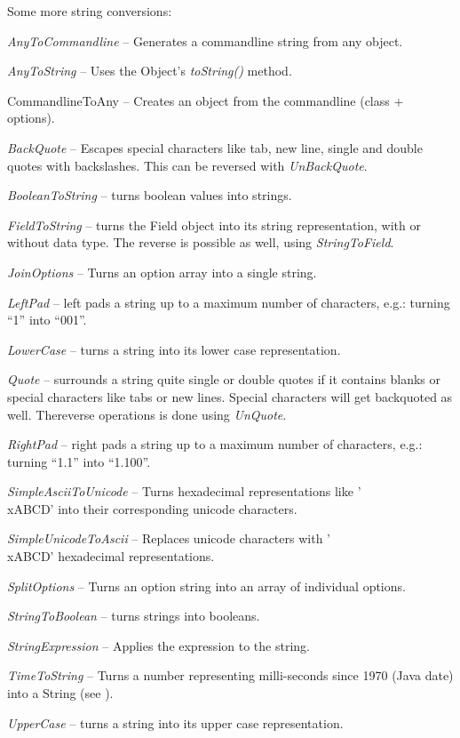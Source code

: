 Some more string conversions:
\begin{tight_itemize}
	\item \textit{AnyToCommandline} -- Generates a commandline string from any
	object.
	\item \textit{AnyToString} -- Uses the Object's \textit{toString()} method.
	\item CommandlineToAny -- Creates an object from the commandline (class +
	options).
	\item \textit{BackQuote} -- Escapes special characters like tab, new line, 
	single and double quotes with backslashes. This can be reversed with 
	\textit{UnBackQuote}.
	\item \textit{BooleanToString} -- turns boolean values into strings.
	\item \textit{FieldToString} -- turns the Field object into its string
	representation, with or without data type. The reverse is possible as well,
	using \textit{StringToField}.
	\item \textit{JoinOptions} -- Turns an option array into a single string.
	\item \textit{LeftPad} -- left pads a string up to a maximum number of
	characters, e.g.: turning ``1'' into ``001''.
	\item \textit{LowerCase} -- turns a string into its lower case representation.
	\item \textit{Quote} -- surrounds a string quite single or double quotes
	if it contains blanks or special characters like tabs or new lines. Special
	characters will get backquoted as well. Thereverse operations is done 
	using \textit{UnQuote}.
	\item \textit{RightPad} -- right pads a string up to a maximum number of
	characters, e.g.: turning ``1.1'' into ``1.100''.
	\item \textit{SimpleAsciiToUnicode} -- Turns hexadecimal representations
	like '\\xABCD' into their corresponding unicode characters.
	\item \textit{SimpleUnicodeToAscii} -- Replaces unicode characters with
	'\\xABCD' hexadecimal representations.
	\item \textit{SplitOptions} -- Turns an option string into an array of individual options.
	\item \textit{StringToBoolean} -- turns strings into booleans.
	\item \textit{StringExpression} -- Applies the expression to the string.
	\item \textit{TimeToString} -- Turns a number representing milli-seconds since
	1970 (Java date) into a String (see \cite{dateformat}).
	\item \textit{UpperCase} -- turns a string into its upper case representation.
\end{tight_itemize}
